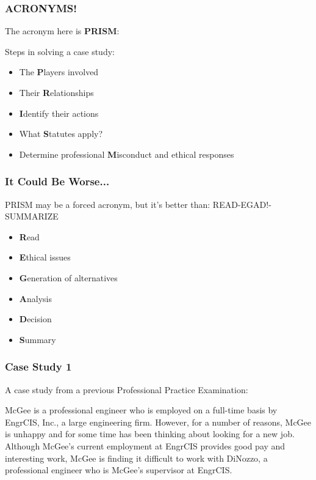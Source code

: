 \begin{frame}
\frametitle{ACRONYMS!}

The acronym here is \textbf{PRISM}:

Steps in solving a case study:
\begin{itemize}
	\item The \textbf{P}layers involved
	\item Their \textbf{R}elationships
	\item \textbf{I}dentify their actions
	\item What \textbf{S}tatutes apply?
	\item Determine professional \textbf{M}isconduct and ethical responses
\end{itemize}

\end{frame}



\begin{frame}
\frametitle{It Could Be Worse...}

PRISM may be a forced acronym, but it's better than:
READ-EGAD!-SUMMARIZE

\begin{itemize}
	\item \textbf{R}ead
	\item \textbf{E}thical issues
	\item \textbf{G}eneration of alternatives
	\item \textbf{A}nalysis
	\item \textbf{D}ecision
	\item \textbf{S}ummary
\end{itemize}

\end{frame}



\begin{frame}
\frametitle{Case Study 1}

A case study from a previous Professional Practice Examination:


	McGee is a professional engineer who is employed on a full-time basis by  EngrCIS, Inc., a large engineering firm.  However, for a number of reasons, McGee is unhappy and for some time has been thinking about looking for a new job.  Although McGee's current employment at EngrCIS provides good pay and interesting work, McGee is finding it difficult to work with DiNozzo, a professional engineer who is McGee's supervisor at EngrCIS.
\end{frame}



